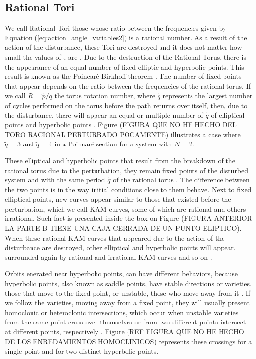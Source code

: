 \subsection{Rational Tori}
We call Rational Tori those whose ratio between the frequencies given by Equation (\ref{eq:action_angle_variables2}) is a rational number. As a result of the action of the disturbance, these Tori are destroyed and it does not matter how small the values of $\epsilon$ are \cite{ott_chaos_2002}. Due to the destruction of the Rational Torus, there is the appearance of an equal number of fixed elliptic and hyperbolic points. This result is known as the Poincaré Birkhoff theorem \cite{lichtenberg2013regular} . The number of fixed points that appear depends on the ratio between the frequencies of the rational torus. If we call $R=\tilde{p}/\tilde{q}$ the torus rotation number, where $\tilde{q}$ represents the largest number of cycles performed on the torus before the path returns over itself, then, due to the disturbance, there will appear an equal or multiple number of $\tilde{q}$ of elliptical points and hyperbolic points \cite{ott_chaos_2002}. Figure (FIGURA QUE NO HE HECHO DEL TORO RACIONAL PERTURBADO POCAMENTE) illustrates a case where $\tilde{q}=3$ and $\tilde{q}=4$ in a Poincaré section for a system with $N=2$.\par

These elliptical and hyperbolic points that result from the breakdown of the rational torus due to the perturbation, they remain fixed points of the disturbed system and with the same period $\tilde{q}$ of the rational torus \cite{lichtenberg2013regular}. The difference between the two points is in the way initial conditions close to them behave. Next to fixed elliptical points, new curves appear similar to those that existed before the perturbation, which we call KAM curves, some of which are rational and others irrational. Such fact is presented inside the box on Figure (FIGURA ANTERIOR LA PARTE B TIENE UNA CAJA CERRADA DE UN PUNTO ELIPTICO). When these rational KAM curves that appeared due to the action of the disturbance are destroyed, other elliptical and hyperbolic points will appear, surrounded again by rational and irrational KAM curves and so on \cite{ott_chaos_2002}.\par

Orbits enerated near hyperbolic points, can have different behaviors, because hyperbolic points, also known as saddle points, have stable directions or varieties, those that move to the fixed point, or unstable, those who move away from it \cite{ott_chaos_2002}. If we follow the varieties, moving away from a fixed point, they will usually present homoclonic or heteroclonic intersections, which occur when unstable varieties from the same point cross over themselves or from two different points intersect at different points, respectively \cite{ott_chaos_2002}. Figure (REF FIGURA QUE NO HE HECHO DE LOS ENREDAMIENTOS HOMOCLINICOS) represents these crossings for a single point and for two distinct hyperbolic points.\par 

